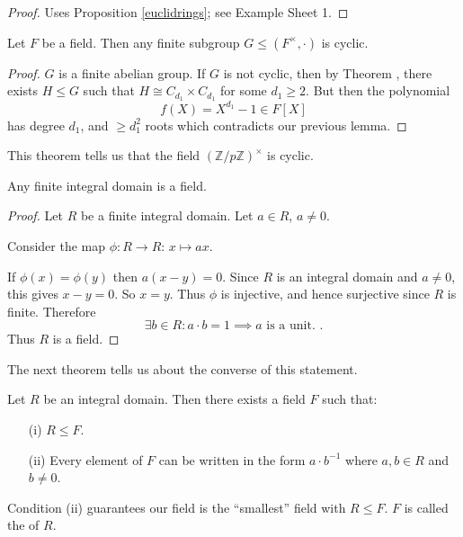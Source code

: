 \documentclass[egregdoesnotlikesansseriftitles,a4paper]{scrartcl}
\begin{document}
\begin{proof}
       Uses Proposition \ref{euclidrings}; see Example Sheet 1.
\end{proof}
\begin{theorem}
       Let $F$ be a field. Then any finite subgroup $G \leq (F^{\times},\cdot )$ is cyclic.
\end{theorem}
\begin{proof}
       $G$ is a finite abelian group. If $G$ is not cyclic, then by Theorem , there exists $H \leq G$ such that $H \cong C_{d_1 }\times C_{d_1 }      $ for some $d_1 \geq 2$. But then the polynomial \[
       f (X)=X^{d_1 }-1 \in F[X]
       \] has degree $d_1 $, and $\geq d_1^2$ roots which contradicts our previous lemma.
\end{proof}
\begin{example*}
      This theorem tells us that the field $(\mathbb{Z}/p\mathbb{Z})^{\times}$ is cyclic. 
\end{example*}
\begin{proposition}
       Any finite integral domain is a field.
\end{proposition}
\begin{proof}
       Let $R$ be a finite integral domain. Let $a \in R$, $a \neq 0$.

       Consider the map $\phi : R \rightarrow R$: $x \mapsto ax$.

       If $\phi (x)=\phi (y)$ then $a (x-y)=0$. Since $R$ is an integral domain and $a \neq 0$, this gives $x-y=0$. So $x=y$. Thus $\phi $ is injective, and hence surjective since $R$ is finite. Therefore \[
       \exists b \in R: a \cdot b=1 \implies a \text{ is a unit. } 
       .\] Thus $R$ is a field.
\end{proof}
The next theorem tells us about the converse of this statement.
\begin{theorem}
       Let $R$ be an integral domain. Then there exists a field $F$ such that:
       \begin{itemize}
             \item[(i)] $R \leq F$.
             \item[(ii)] Every element of $F$ can be written in the form $a \cdot b^{-1}$ where $a,b \in R$ and $b \neq 0$.
       \end{itemize}
       \begin{remark}
            Condition (ii) guarantees our field is the ``smallest'' field with $R \leq F$. $F$ is called the  of $R$.
       \end{remark}
\end{theorem}
\end{document}
